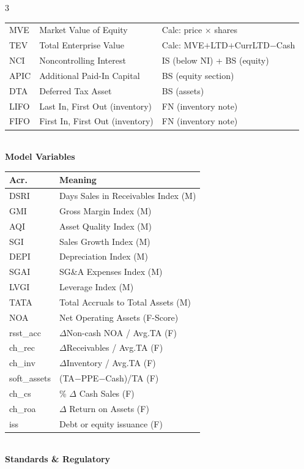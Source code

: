 \documentclass[10pt]{article}
\begin{document}
\begin{multicols}{3}
{\begin{tabular}{@{}l@{\ }l@{\ }l@{}}
MVE  & Market Value of Equity & Calc: price $\times$ shares \\
TEV  & Total Enterprise Value & Calc: MVE$+$LTD$+$CurrLTD$-$Cash \\
NCI  & Noncontrolling Interest & IS (below NI) + BS (equity) \\
APIC & Additional Paid-In Capital & BS (equity section) \\
DTA  & Deferred Tax Asset & BS (assets) \\
LIFO & Last In, First Out (inventory) & FN (inventory note) \\
FIFO & First In, First Out (inventory) & FN (inventory note) \\
\bottomrule
\end{tabular}}\\[3pt]
\textbf{Model Variables}\\[1pt]
{\scriptsize\begin{tabular}{@{}l@{\ }l@{}}
\toprule
Acr. & Meaning \\
\midrule
DSRI  & Days Sales in Receivables Index (M) \\
GMI   & Gross Margin Index (M) \\
AQI   & Asset Quality Index (M) \\
SGI   & Sales Growth Index (M) \\
DEPI  & Depreciation Index (M) \\
SGAI  & SG\&A Expenses Index (M) \\
LVGI  & Leverage Index (M) \\
TATA  & Total Accruals to Total Assets (M) \\
NOA   & Net Operating Assets (F-Score) \\
rsst\_acc & $\Delta$Non-cash NOA / Avg.TA (F) \\
ch\_rec  & $\Delta$Receivables / Avg.TA (F) \\
ch\_inv  & $\Delta$Inventory / Avg.TA (F) \\
soft\_assets & (TA$-$PPE$-$Cash)/TA (F) \\
ch\_cs   & \% $\Delta$ Cash Sales (F) \\
ch\_roa  & $\Delta$ Return on Assets (F) \\
iss      & Debt or equity issuance (F) \\
\bottomrule
\end{tabular}}\\[3pt]
\textbf{Standards \& Regulatory}\\[1pt]
{\scriptsize\begin{tabular}{@{}l@{\ }l@{}}

\end{tabular}}
\end{multicols}
\end{document}
